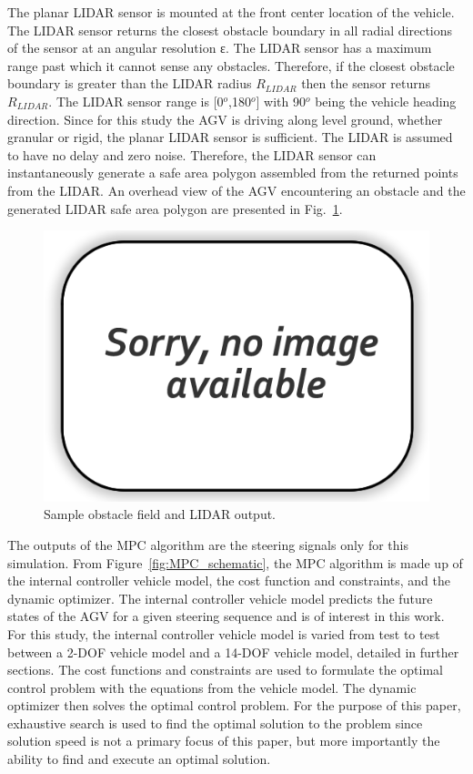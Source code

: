 \documentclass[12pt,twocolumn]{article}
\begin{document}
The planar LIDAR sensor is mounted at the front center location of the vehicle. The LIDAR sensor returns the closest obstacle boundary in all radial directions of the sensor at an angular resolution ε. The LIDAR sensor has a maximum range past which it cannot sense any obstacles. Therefore, if the closest obstacle boundary is greater than the LIDAR radius $R_{LIDAR}$ then the sensor returns $R_{LIDAR}$. The LIDAR sensor range is [0$^o$,180$^o$] with 90$^o$ being the vehicle heading direction. Since for this study the AGV is driving along level ground, whether granular or rigid, the planar LIDAR sensor is sufficient. The LIDAR is assumed to have no delay and zero noise. Therefore, the LIDAR sensor can instantaneously generate a safe area polygon assembled from the returned points from the LIDAR. An overhead view of the AGV encountering an obstacle and the generated LIDAR safe area polygon are presented in Fig.~\ref{fig:obstacle_field}. 
%
\begin{figure}
	\centering
	\includegraphics[width=\columnwidth]{Figs/no-image.png}
	\caption{\small Sample obstacle field and LIDAR output.}    
	\label{fig:obstacle_field}
\end{figure}
	
The outputs of the MPC algorithm are the steering signals only for this simulation. From Figure~\ref{fig:MPC_schematic}, the MPC algorithm is made up of the internal controller vehicle model, the cost function and constraints, and the dynamic optimizer. The internal controller vehicle model predicts the future states of the AGV for a given steering sequence and is of interest in this work. For this study, the internal controller vehicle model is varied from test to test between a 2-DOF vehicle model and a 14-DOF vehicle model, detailed in further sections. The cost functions and constraints are used to formulate the optimal control problem with the equations from the vehicle model. The dynamic optimizer then solves the optimal control problem. For the purpose of this paper, exhaustive search is used to find the optimal solution to the problem since solution speed is not a primary focus of this paper, but more importantly the ability to find and execute an optimal solution.
\end{document}

